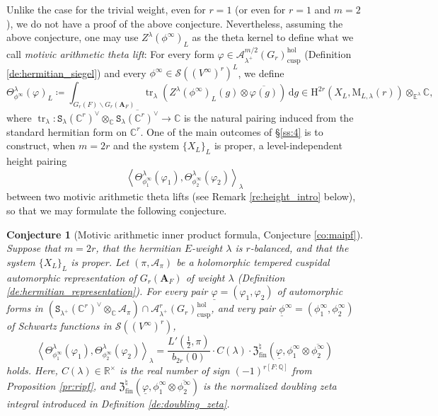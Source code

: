 \documentclass[12pt]{amsart}
\numberwithin{equation}{section}
\theoremstyle{plain}
\newtheorem{conjecture}[proposition]{Conjecture}
\theoremstyle{definition}
\theoremstyle{remark}
\renewcommand{\b}[1]{\mathbf{#1}}
\renewcommand{\c}[1]{\mathcal{#1}}
\renewcommand{\d}[1]{\mathbb{#1}}
\newcommand{\f}[1]{\mathfrak{#1}}
\renewcommand{\r}[1]{\mathrm{#1}}
\newcommand{\s}[1]{\mathscr{#1}}
\renewcommand{\(}{\left(}
\renewcommand{\)}{\right)}
\newcommand{\ol}[1]{\overline{#1}{}}
\newcommand{\ul}{\underline}
\newcommand{\bA}{\b A}
\newcommand{\cA}{\c A}
\newcommand{\dC}{\d C}
\newcommand{\dE}{\d E}
\newcommand{\dQ}{\d Q}
\newcommand{\dR}{\d R}
\newcommand{\fZ}{\f Z}
\newcommand{\rH}{\r H}
\newcommand{\rM}{\r M}
\newcommand{\rd}{\,\r d}
\newcommand{\sS}{\s S}
\newcommand{\tS}{\mathtt{S}}
\newcommand{\llangle}{\left\langle}
\newcommand{\rrangle}{\right\rangle}
\newcommand{\cusp}{\r{cusp}}
\newcommand{\fin}{\r{fin}}
\newcommand{\hol}{\r{hol}}
\DeclareMathOperator{\tr}{tr}
\begin{document}
Unlike the case for the trivial weight, even for $r=1$ (or even for $r=1$ and $m=2$), we do not have a proof of the above conjecture. Nevertheless, assuming the above conjecture, one may use $Z^\lambda(\phi^\infty)_L$ as the theta kernel to define what we call \emph{motivic arithmetic theta lift}: For every form $\varphi\in\cA_{\lambda^+}^{m/2}(G_r)_\cusp^\hol$ (Definition \ref{de:hermitian_siegel}) and every $\phi^\infty\in\sS((V^\infty)^r)^L$, we define
\[
\Theta_{\phi^\infty}^\lambda(\varphi)_L\coloneqq\int_{G_r(F)\backslash G_r(\bA_F)}
\tr_\lambda\(Z^\lambda(\phi^\infty)_L(g)\otimes\ol{\varphi(g)}\)\rd g
\in \rH^{2r}(X_L,\rM_{L,\lambda}(r))\otimes_{\dE^\lambda}\dC,
\]
where $\tr_\lambda\colon\tS_\lambda(\dC^r)^\vee\otimes_\dC\ol{\tS_\lambda(\dC^r)^\vee}\to\dC$ is the natural pairing induced from the standard hermitian form on $\dC^r$. One of the main outcomes of \S\ref{ss:4} is to construct, when $m=2r$ and the system $\{X_L\}_L$ is proper, a level-independent height pairing
\[
\llangle\Theta_{\phi^\infty_1}^\lambda(\varphi_1),\Theta_{\phi^\infty_2}^\lambda(\varphi_2)\rrangle_\lambda
\]
between two motivic arithmetic theta lifts (see Remark \ref{re:height_intro} below), so that we may formulate the following conjecture.

\begin{conjecture}[Motivic arithmetic inner product formula, Conjecture \ref{co:maipf}]
Suppose that $m=2r$, that the hermitian $E$-weight $\lambda$ is $r$-balanced, and that the system $\{X_L\}_L$ is proper. Let $(\pi,\cA_\pi)$ be a holomorphic tempered cuspidal automorphic representation of $G_r(\bA_F)$ of weight $\lambda$ (Definition \ref{de:hermitian_representation}). For every pair $\ul\varphi=(\varphi_1,\varphi_2)$ of automorphic forms in $\(\tS_{\lambda^+}(\dC^r)^\vee\otimes_\dC\cA_\pi\)\cap\cA_{\lambda^+}^r(G_r)_\cusp^\hol$, and very pair $\ul\phi^\infty=(\phi^\infty_1,\phi^\infty_2)$ of Schwartz functions in $\sS((V^\infty)^r)$,
\[
\llangle\Theta_{\phi^\infty_1}^\lambda(\varphi_1),\Theta_{\phi^\infty_2}^\lambda(\varphi_2)\rrangle_\lambda
=\frac{L'(\tfrac{1}{2},\pi)}{b_{2r}(0)}\cdot C(\lambda)\cdot
\fZ^\natural_\fin(\ul\varphi,\phi^\infty_1\otimes\ol{\phi^\infty_2})
\]
holds. Here, $C(\lambda)\in\dR^\times$ is the real number of sign $(-1)^{r[F:\dQ]}$ from Proposition \ref{pr:ripf}, and $\fZ^\natural_\fin(\ul\varphi,\phi^\infty_1\otimes\ol{\phi^\infty_2})$ is the normalized doubling zeta integral introduced in Definition \ref{de:doubling_zeta}.
\end{conjecture}
\end{document}
